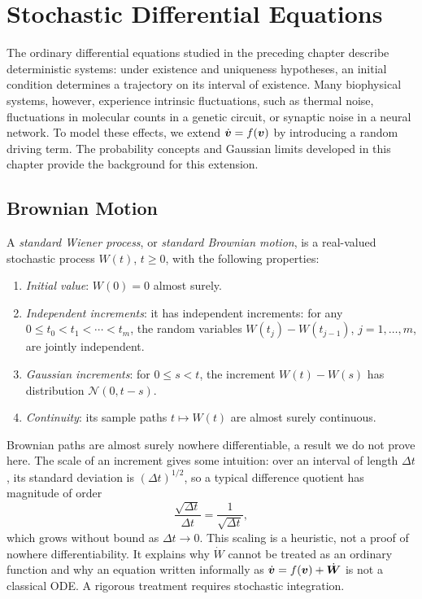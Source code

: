 \section{Stochastic Differential Equations}
\label{sec:stochastic-differential-equations}

The ordinary differential equations studied in the preceding chapter describe deterministic systems: under existence and uniqueness hypotheses, an initial condition determines a trajectory on its interval of existence. Many biophysical systems, however, experience intrinsic fluctuations, such as thermal noise, fluctuations in molecular counts in a genetic circuit, or synaptic noise in a neural network. To model these effects, we extend $\dot{\bm{v}}=f(\bm{v})$ by introducing a random driving term. The probability concepts and Gaussian limits developed in this chapter provide the background for this extension.

\subsection{Brownian Motion}

\begin{definition}
\label{def:wiener-process}
A \emph{standard Wiener process}, or \emph{standard Brownian motion}, is a real-valued stochastic process $W(t)$, $t\ge0$, with the following properties:
\begin{enumerate}
\item \textit{Initial value}: $W(0)=0$ almost surely.
\item \textit{Independent increments}: it has independent increments: for any $0\leq t_0<t_1<\cdots<t_m$, the random variables $W(t_j)-W(t_{j-1})$, $j=1,\dots,m$, are jointly independent.
\item \textit{Gaussian increments}: for $0\leq s<t$, the increment $W(t)-W(s)$ has distribution $\mathcal{N}(0,t-s)$.
\item \textit{Continuity}: its sample paths $t\mapsto W(t)$ are almost surely continuous.
\end{enumerate}
\end{definition}

\begin{remark}
Brownian paths are almost surely nowhere differentiable, a result we do not prove here. The scale of an increment gives some intuition: over an interval of length $\Delta t$, its standard deviation is $(\Delta t)^{1/2}$, so a typical difference quotient has magnitude of order
\[
\frac{\sqrt{\Delta t}}{\Delta t}=\frac{1}{\sqrt{\Delta t}},
\] which grows without bound as $\Delta t\to0$. This scaling is a heuristic, not a proof of nowhere differentiability. It explains why $\dot W$ cannot be treated as an ordinary function and why an equation written informally as $\dot{\bm{v}}=f(\bm{v})+\dot{\bm{W}}$ is not a classical ODE. A rigorous treatment requires stochastic integration.
\end{remark}


